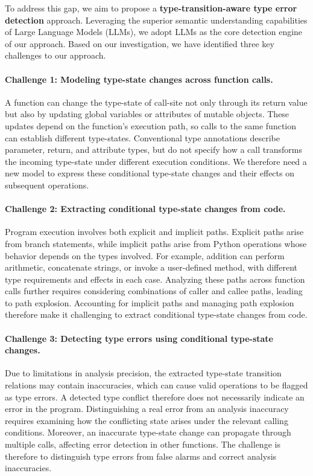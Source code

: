 To address this gap, we aim to propose a \textbf{type-transition-aware type error detection} approach.
Leveraging the superior semantic understanding capabilities of Large Language Models (LLMs), we
adopt LLMs as the core detection engine of our approach. Based on our investigation, we have
identified three key challenges to our approach.

\paragraph{Challenge 1: Modeling type-state changes across function calls.}
A function can change the type-state of call-site not only through its return
value but also by updating global variables or attributes of mutable
objects. 
These updates depend on the function's execution path, so calls
to the same function can establish different type-states. Conventional
type annotations describe parameter, return, and attribute types, but do
not specify how a call transforms the incoming type-state under different
execution conditions. We therefore need a new model to express these
conditional type-state changes and their effects on subsequent operations.

\paragraph{Challenge 2: Extracting conditional type-state changes from code.}
Program execution involves both explicit and implicit paths. Explicit
paths arise from branch statements, while implicit paths arise from Python
operations whose behavior depends on the types involved. For example,
addition can perform arithmetic, concatenate strings, or invoke a
user-defined method, with different type requirements and effects in each
case. Analyzing these paths across function calls further requires
considering combinations of caller and callee paths, leading to path
explosion. Accounting for implicit paths and managing path explosion
therefore make it challenging to extract conditional type-state changes
from code.

\paragraph{Challenge 3: Detecting type errors using conditional type-state changes.}
Due to limitations in analysis precision, the extracted type-state
transition relations may contain inaccuracies, which can cause valid
operations to be flagged as type errors. A detected type conflict therefore
does not necessarily indicate
an error in the program. Distinguishing a real error from an analysis
inaccuracy requires examining how the conflicting state arises under the
relevant calling conditions. Moreover, an inaccurate type-state change
can propagate through multiple calls, affecting error detection in other
functions. The challenge is therefore to distinguish type errors
from false alarms and correct analysis inaccuracies.

